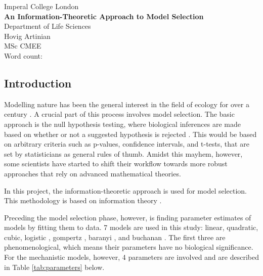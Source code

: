 \documentclass[11pt]{article}
\newcommand\wordcount{}
\begin{document}
	\begin{titlepage}
		\centering
		\vspace*{\fill}
		Imperal College London\\
		\textbf{An Information-Theoretic Approach to Model Selection}\\
		Department of Life Sciences\\
		\hfill \break
		\hfill \break
		Hovig Artinian\\
		MSc CMEE\\
		Word count: \wordcount
		\vspace*{\fill}
	\end{titlepage}


	\tableofcontents
	
	\newpage
	\begin{linenumbers}
	\section{Introduction}

	Modelling nature has been the general interest in the field of ecology for over a century \cite{Kingsland1995}. A crucial part of this process involves model selection. The basic approach is the null hypothesis testing, where biological inferences are made based on whether or not a suggested hypothesis is rejected \cite{Johnson2004}. This would be based on arbitrary criteria such as p-values, confidence intervals, and t-tests, that are set by statisticians as general rules of thumb. Amidst this mayhem, however, some scientists have started to shift their workflow towards more robust approaches that rely on advanced mathematical theories.
	\par In this project, the information-theoretic approach is used for model selection. This methodology is based on information theory \cite{Guiasu1977}.
	\par Preceding the model selection phase, however, is finding parameter estimates of models by fitting them to data. 7 models are used in this study: linear, quadratic, cubic, logistic \cite{Pearl1920}, gompertz \cite{Zwietering1990}, baranyi \cite{Baranyi1994}, and buchanan \cite{Buchanan1997}. The first three are phenomenological, which means their parameters have no biological significance. For the mechanistic models, however, 4 parameters are involved and are described in Table \ref{tab:parameters} below.
	

\end{linenumbers}
\end{document}
